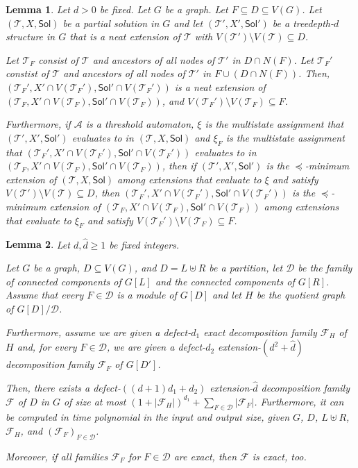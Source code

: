 \documentclass[10pt,a4paper]{amsart}
\newcommand{\Aa}{\mathcal{A}}
\newtheorem{lemma}{Lemma}
\def\Sol{\mathsf{Sol}}
\def\T{\mathcal{T}}
\begin{document}
\begin{lemma}\label{lem:use-neatness}
Let $d > 0$ be fixed. Let $G$ be a graph. 
Let $F \subseteq D \subseteq V(G)$. 
Let $(\T,X,\Sol)$ be a partial solution in $G$ and
let $(\T',X',\Sol')$ be a treedepth-$d$ structure in $G$ that is a neat extension of $\T$
with $V(\T') \setminus V(\T) \subseteq D$.

Let $\T_F$ consist of $\T$ and ancestors
 of all nodes of $\T'$ in $D \cap N(F)$.
 Let $\T_F'$ constist of $\T$ and ancestors
 of all nodes of $\T'$ in $F \cup (D \cap N(F))$. 
 Then, $(\T_F', X' \cap V(\T_F'), \Sol' \cap V(\T_F'))$ is a neat extension
 of $(\T_F, X' \cap V(\T_F), \Sol' \cap V(\T_F))$, 
 and $V(\T_F') \setminus V(\T_F) \subseteq F$.

 Furthermore, if $\Aa$ is a threshold automaton,
 $\xi$ is the multistate assignment that $(\T',X',\Sol')$ evaluates
 to in $(\T,X,\Sol)$ and $\xi_F$ is the multistate assignment 
that $(\T_F', X' \cap V(\T_F'), \Sol' \cap V(\T_F'))$
evaluates to in $(\T_F, X' \cap V(\T_F), \Sol' \cap V(\T_F))$,
 then if $(\T',X',\Sol')$ is the $\preceq$-minimum extension
 of $(\T,X,\Sol)$ among extensions that evaluate to $\xi$ and satisfy
 $V(\T') \setminus V(\T) \subseteq D$, then 
$(\T_F', X' \cap V(\T_F'), \Sol' \cap V(\T_F'))$
is the $\preceq$-minimum extension of $(\T_F, X' \cap V(\T_F), \Sol' \cap V(\T_F))$
among extensions 
that evaluate to $\xi_F$ and satisfy $V(\T_F') \setminus V(\T_F) \subseteq F$. 
\end{lemma}

\begin{lemma}\label{lem:handle-bip}
    Let $d,\widehat{d} \geq 1$ be fixed integers.
    
    Let $G$ be a graph, $D \subseteq V(G)$, and $D = L \uplus R$ be a partition, 
    let $\mathcal{D}$ be the family of connected components of $G[L]$
    and the connected components of $G[R]$. 
    Assume that every $F \in \mathcal{D}$ is a module of $G[D]$
    and let $H$ be the quotient graph of $G[D]/\mathcal{D}$. 

    Furthermore, assume we are given a defect-$d_1$ exact decomposition family $\mathcal{F}_H$ of $H$ 
    and, for every $F \in \mathcal{D}$, we are given a defect-$d_2$ extension-$(d^2+\widehat{d})$ decomposition
    family $\mathcal{F}_{F}$ of $G[D']$. 

    Then, there exists a defect-$((d+1)d_1+d_2)$ extension-$\widehat{d}$
    decomposition family $\mathcal{F}$ of $D$ in $G$ of size
    at most $(1+|\mathcal{F}_H|)^{d_1} + \sum_{F \in \mathcal{D}} |\mathcal{F}_{F}|$. 
    Furthermore, it can be computed in time polynomial in the input and output size,
    given $G$, $D$, $L \uplus R$, $\mathcal{F}_H$, and $(\mathcal{F}_{F})_{F \in \mathcal{D}}$. 

    Moreover, if all families $\mathcal{F}_{F}$ for $F \in \mathcal{D}$ are exact,
    then $\mathcal{F}$ is exact, too.
\end{lemma}
\end{document}
